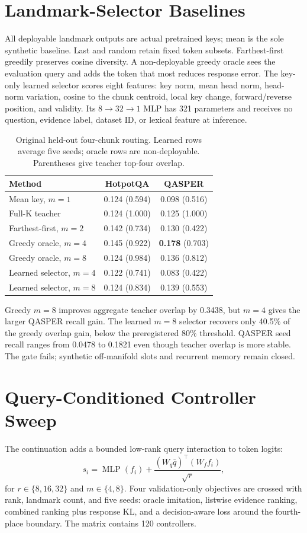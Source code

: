 \documentclass[11pt]{article}
\newcommand{\hotpot}{HotpotQA\xspace}
\newcommand{\qasper}{QASPER\xspace}
\begin{document}
\section{Landmark-Selector Baselines}
All deployable landmark outputs are actual pretrained keys; mean is the sole
synthetic baseline. Last and random retain fixed token subsets. Farthest-first
greedily preserves cosine diversity. A non-deployable greedy oracle sees the
evaluation query and adds the token that most reduces response error. The
key-only learned selector scores eight features: key norm, mean head norm,
head-norm variation, cosine to the chunk centroid, local key change,
forward/reverse position, and validity. Its $8\rightarrow32\rightarrow1$ MLP
has 321 parameters and receives no question, evidence label, dataset ID, or
lexical feature at inference.

\begin{table}[H]
\centering
\caption{Original held-out four-chunk routing. Learned rows average five seeds;
oracle rows are non-deployable. Parentheses give teacher top-four overlap.}
\label{tab:landmarks}
\begin{tabular}{lcc}
\toprule
Method & \hotpot & \qasper \\
\midrule
Mean key, $m=1$ & 0.124 (0.594) & 0.098 (0.516) \\
Full-K teacher & 0.124 (1.000) & 0.125 (1.000) \\
Farthest-first, $m=2$ & 0.142 (0.734) & 0.130 (0.422) \\
Greedy oracle, $m=4$ & 0.145 (0.922) & \textbf{0.178} (0.703) \\
Greedy oracle, $m=8$ & 0.124 (0.984) & 0.136 (0.812) \\
Learned selector, $m=4$ & 0.122 (0.741) & 0.083 (0.422) \\
Learned selector, $m=8$ & 0.124 (0.834) & 0.139 (0.553) \\
\bottomrule
\end{tabular}
\end{table}

Greedy $m=8$ improves aggregate teacher overlap by 0.3438, but $m=4$ gives the
larger QASPER recall gain. The learned $m=8$ selector recovers only 40.5\% of
the greedy overlap gain, below the preregistered 80\% threshold. QASPER seed
recall ranges from 0.0478 to 0.1821 even though teacher overlap is more stable.
The gate fails; synthetic off-manifold slots and recurrent memory remain closed.

\section{Query-Conditioned Controller Sweep}
The continuation adds a bounded low-rank query interaction to token logits:
\begin{equation}
  s_i=\operatorname{MLP}(f_i)+
  \frac{(W_q\bar q)^\top(W_ff_i)}{\sqrt r},
\end{equation}
for $r\in\{8,16,32\}$ and $m\in\{4,8\}$. Four validation-only objectives are
crossed with rank, landmark count, and five seeds: oracle imitation, listwise
evidence ranking, combined ranking plus response KL, and a decision-aware loss
around the fourth-place boundary. The matrix contains 120 controllers.
\end{document}
